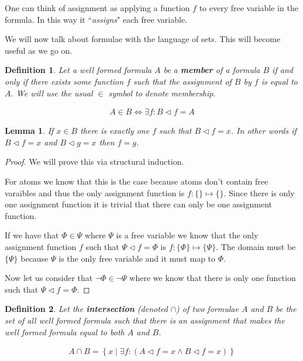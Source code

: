 \documentclass{article}
\newtheorem{lem}{Lemma}
\newtheorem{defin}{Definition}
\begin{document}
One can think of assignment as applying a function $f$ to every free variable in the formula.
In this way it ``\textit{assigns}" each free variable.

We will now talk about formulae with the language of sets.
This will become useful as we go on.

\begin{defin}
Let a well formed formula $A$ be a \textbf{member} of a formula $B$
if and only if there exists some function $f$ such that the assignment of $B$ by $f$ is equal to $A$.
We will use the usual $\in$ symbol to denote membership.

\begin{align*}
A \in B \iff \exists f: B \lhd f = A
\end{align*}
\end{defin}

\begin{lem}
If $x \in B$ there is exactly one $f$ such that $B \lhd f = x$.
In other words if $B \lhd f = x$ and $B \lhd g = x$ then $f = g$.
\end{lem}
\begin{proof}
We will prove this via structural induction.

For atoms we know that this is the case because atoms don't contain free varaibles and thus the only assignment function is $f : \{\} \mapsto \{\}$.
Since there is only one assignment function it is trivial that there can only be one assignment function.

If we have that $\Phi \in \Psi$ where $\Psi$ is a free variable we know that the only assignment function $f$ such that $\Psi \lhd f = \Phi$ is $f : \{\Phi\} \mapsto \{\Psi\}$.
The domain must be $\{\Psi\}$ because $\Psi$ is the only free variable and it must map to $\Phi$.

Now let us consider that $\neg \Phi \in \neg \Psi$ where we know that there is only one function such that $\Psi \lhd f = \Phi$.
\end{proof}

\begin{defin}
Let the \textbf{intersection} (denoted $\cap$) of two formulae $A$ and $B$ be the set of all well formed formula such that there is an assignment that makes the well formed formula equal to both $A$ and $B$.

\begin{align*}
A \cap B = \left\{x \mid \exists f: (A \lhd f = x \land B \lhd f = x)\right\}
\end{align*}
\end{defin}
\end{document}
